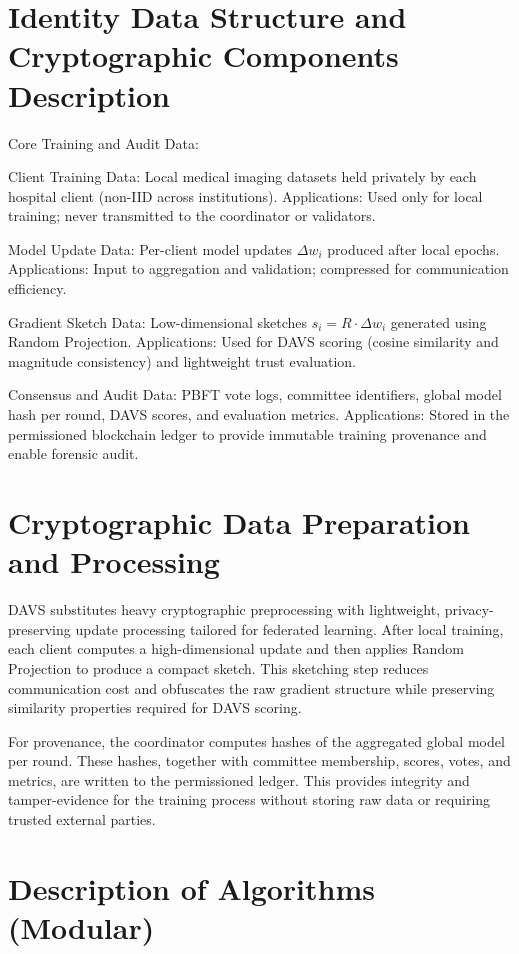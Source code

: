 \section{Identity Data Structure and Cryptographic Components Description}
Core Training and Audit Data:

Client Training Data:
Local medical imaging datasets held privately by each hospital client (non-IID across institutions).
Applications: Used only for local training; never transmitted to the coordinator or validators.

Model Update Data:
Per-client model updates \(\Delta w_i\) produced after local epochs.
Applications: Input to aggregation and validation; compressed for communication efficiency.

Gradient Sketch Data:
Low-dimensional sketches \(s_i = R \cdot \Delta w_i\) generated using Random Projection.
Applications: Used for DAVS scoring (cosine similarity and magnitude consistency) and lightweight trust evaluation.

Consensus and Audit Data:
PBFT vote logs, committee identifiers, global model hash per round, DAVS scores, and evaluation metrics.
Applications: Stored in the permissioned blockchain ledger to provide immutable training provenance and enable forensic audit.



\section{Cryptographic Data Preparation and Processing}

DAVS substitutes heavy cryptographic preprocessing with lightweight, privacy-preserving update processing tailored for federated learning. After local training, each client computes a high-dimensional update and then applies Random Projection to produce a compact sketch. This sketching step reduces communication cost and obfuscates the raw gradient structure while preserving similarity properties required for DAVS scoring.

For provenance, the coordinator computes hashes of the aggregated global model per round. These hashes, together with committee membership, scores, votes, and metrics, are written to the permissioned ledger. This provides integrity and tamper-evidence for the training process without storing raw data or requiring trusted external parties.

\section{Description of Algorithms (Modular)}

